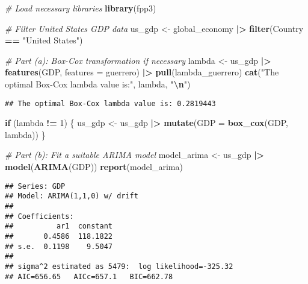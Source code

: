 \documentclass[
]{article}
\newenvironment{Shaded}{\begin{snugshade}}{\end{snugshade}}
\newcommand{\AttributeTok}[1]{\textcolor[rgb]{0.13,0.29,0.53}{#1}}
\newcommand{\CommentTok}[1]{\textcolor[rgb]{0.56,0.35,0.01}{\textit{#1}}}
\newcommand{\ControlFlowTok}[1]{\textcolor[rgb]{0.13,0.29,0.53}{\textbf{#1}}}
\newcommand{\DecValTok}[1]{\textcolor[rgb]{0.00,0.00,0.81}{#1}}
\newcommand{\FunctionTok}[1]{\textcolor[rgb]{0.13,0.29,0.53}{\textbf{#1}}}
\newcommand{\NormalTok}[1]{#1}
\newcommand{\OtherTok}[1]{\textcolor[rgb]{0.56,0.35,0.01}{#1}}
\newcommand{\SpecialCharTok}[1]{\textcolor[rgb]{0.81,0.36,0.00}{\textbf{#1}}}
\newcommand{\StringTok}[1]{\textcolor[rgb]{0.31,0.60,0.02}{#1}}
\begin{document}
\begin{Shaded}
\begin{Highlighting}[]
\CommentTok{\# Load necessary libraries}
\FunctionTok{library}\NormalTok{(fpp3)}

\CommentTok{\# Filter United States GDP data}
\NormalTok{us\_gdp }\OtherTok{\textless{}{-}}\NormalTok{ global\_economy }\SpecialCharTok{|\textgreater{}} \FunctionTok{filter}\NormalTok{(Country }\SpecialCharTok{==} \StringTok{"United States"}\NormalTok{)}

\CommentTok{\# Part (a): Box{-}Cox transformation if necessary}
\NormalTok{lambda }\OtherTok{\textless{}{-}}\NormalTok{ us\_gdp }\SpecialCharTok{|\textgreater{}} 
  \FunctionTok{features}\NormalTok{(GDP, }\AttributeTok{features =}\NormalTok{ guerrero) }\SpecialCharTok{|\textgreater{}} 
  \FunctionTok{pull}\NormalTok{(lambda\_guerrero)}
\FunctionTok{cat}\NormalTok{(}\StringTok{"The optimal Box{-}Cox lambda value is:"}\NormalTok{, lambda, }\StringTok{"}\SpecialCharTok{\textbackslash{}n}\StringTok{"}\NormalTok{)}
\end{Highlighting}
\end{Shaded}

\begin{verbatim}
## The optimal Box-Cox lambda value is: 0.2819443
\end{verbatim}

\begin{Shaded}
\begin{Highlighting}[]
\ControlFlowTok{if}\NormalTok{ (lambda }\SpecialCharTok{!=} \DecValTok{1}\NormalTok{) \{}
\NormalTok{  us\_gdp }\OtherTok{\textless{}{-}}\NormalTok{ us\_gdp }\SpecialCharTok{|\textgreater{}} \FunctionTok{mutate}\NormalTok{(}\AttributeTok{GDP =} \FunctionTok{box\_cox}\NormalTok{(GDP, lambda))}
\NormalTok{\}}

\CommentTok{\# Part (b): Fit a suitable ARIMA model}
\NormalTok{model\_arima }\OtherTok{\textless{}{-}}\NormalTok{ us\_gdp }\SpecialCharTok{|\textgreater{}} \FunctionTok{model}\NormalTok{(}\FunctionTok{ARIMA}\NormalTok{(GDP))}
\FunctionTok{report}\NormalTok{(model\_arima)}
\end{Highlighting}
\end{Shaded}

\begin{verbatim}
## Series: GDP 
## Model: ARIMA(1,1,0) w/ drift 
## 
## Coefficients:
##          ar1  constant
##       0.4586  118.1822
## s.e.  0.1198    9.5047
## 
## sigma^2 estimated as 5479:  log likelihood=-325.32
## AIC=656.65   AICc=657.1   BIC=662.78
\end{verbatim}
\end{document}
